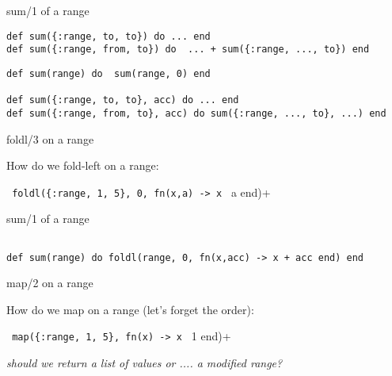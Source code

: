 \begin{frame}[fragile]{sum/1 of a range}

  \pause
\begin{verbatim}
def sum({:range, to, to}) do ... end  
def sum({:range, from, to}) do  ... + sum({:range, ..., to}) end  
\end{verbatim}

  \vspace{20pt}  \pause
  
\begin{verbatim}
def sum(range) do  sum(range, 0) end

def sum({:range, to, to}, acc) do ... end  
def sum({:range, from, to}, acc) do sum({:range, ..., to}, ...) end  
\end{verbatim}
  
  
\end{frame}

\begin{frame}[fragile]{foldl/3 on a range}

  How do we fold-left on a range:  \pause

  \vspace{20pt}

  \verb+ foldl({:range, 1, 5}, 0, fn(x,a) -> x + a end)+

\end{frame}


\begin{frame}[fragile]{sum/1 of a range}


\begin{verbatim}

def sum(range) do foldl(range, 0, fn(x,acc) -> x + acc end) end

\end{verbatim}
  
\end{frame}


\begin{frame}[fragile]{map/2 on a range}

  How do we map on a range (let's forget the order):  \pause

  \vspace{20pt}

  \verb+ map({:range, 1, 5}, fn(x) -> x + 1 end)+ \pause

  \vspace{20pt}
  {\em should we return a list of values or .... a modified range?}

\end{frame}


